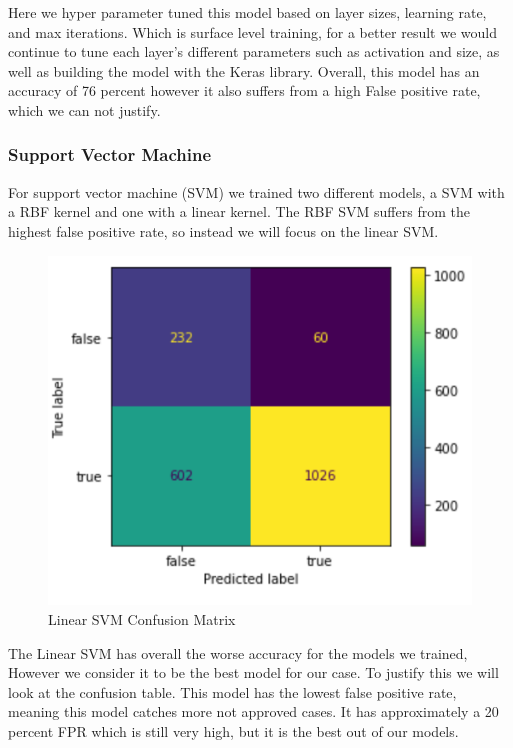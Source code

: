 \documentclass[12pt]{article}
\begin{document}
\noindent Here we hyper parameter tuned this model based on layer sizes, learning rate, and max iterations. Which is surface level training, for a better result we would continue to tune each layer's different parameters such as activation and size, as well as building the model with the Keras library. Overall, this model has an accuracy of 76 percent however it also suffers from a high False positive rate, which we can not justify. \\

\subsubsection{Support Vector Machine}

\noindent For support vector machine (SVM) we trained two different models, a SVM with a RBF kernel and one with a linear kernel. The RBF SVM suffers from the highest false positive rate, so instead we will focus on the linear SVM.\\

\begin{figure}
    \centering
    \includegraphics[scale = .30]{figures/LSVMconf.png} 
    \caption{Linear SVM Confusion Matrix}
\end{figure}

\noindent The Linear SVM has overall the worse accuracy for the models we trained, However we consider it to be the best model for our case. To justify this we will look at the confusion table. This model has the lowest false positive rate, meaning this model catches more not approved cases. It has approximately a 20 percent FPR which is still very high, but it is the best out of our models. \\ \\ \\ \\ \\
\end{document}
